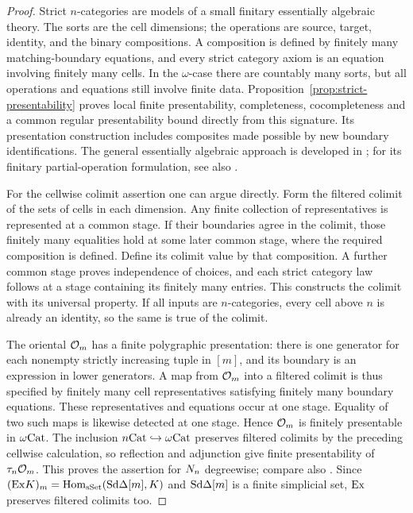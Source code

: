 \begin{proof}
Strict $n$-categories are models of a small finitary essentially
algebraic theory.  The sorts are the cell dimensions; the operations
are source, target, identity, and the binary compositions.  A
composition is defined by finitely many matching-boundary equations,
and every strict category axiom is an equation involving finitely
many cells.  In the $\omega$-case there are countably many sorts,
but all operations and equations still involve finite data.
Proposition~\ref{prop:strict-presentability} proves local finite
presentability, completeness, cocompleteness and a common regular
presentability bound directly from this signature. Its presentation
construction includes composites made possible by new boundary
identifications. The general essentially algebraic approach is developed
in \cite{AdamekRosicky1994,AdamekHebertRosicky1999}; for its finitary
partial-operation formulation, see also
\cite[pp.~52--53]{HebertAdamekRosicky2001}.

For the cellwise colimit assertion one can argue directly.  Form
the filtered colimit of the sets of cells in each dimension.
Any finite collection of representatives is represented at a common
stage.  If their boundaries agree in the colimit, those finitely many
equalities hold at some later common stage, where the required
composition is defined.  Define its colimit value by that
composition.  A further common stage proves independence of choices,
and each strict category law follows at a stage containing its
finitely many entries.  This constructs the colimit with its
universal property.  If all inputs are $n$-categories, every cell
above $n$ is already an identity, so the same is true of the colimit.

The oriental $\mathcal O_{m}$ has a finite polygraphic presentation:
there is one generator for each nonempty strictly increasing tuple
in $[m]$, and its boundary is an expression in lower generators.
A map from $\mathcal O_{m}$ into a filtered colimit is thus specified by
finitely many cell representatives satisfying finitely many
boundary equations.  These representatives and equations occur at
one stage.  Equality of two such maps is likewise detected at one
stage.  Hence $\mathcal O_{m}$ is finitely presentable in $\omega\mathrm{Cat}$.
The inclusion $n\mathrm{Cat}\hookrightarrow\omega\mathrm{Cat}$ preserves filtered
colimits by the preceding cellwise calculation, so reflection and
adjunction give finite presentability of $\tau_n\mathcal O_{m}$.
This proves the assertion for $N_n$ degreewise; compare also
\cite[Proposition~5.13(a)]{AraMaltsiniotis2014}.
Since
$(\mathrm{Ex} K)_m=\operatorname{Hom}_{\mathrm{sSet}}(\mathrm{Sd}\Delta[m],K)$ and
$\mathrm{Sd}\Delta[m]$ is a finite simplicial set, $\mathrm{Ex}$ preserves filtered
colimits too.


\end{proof}
